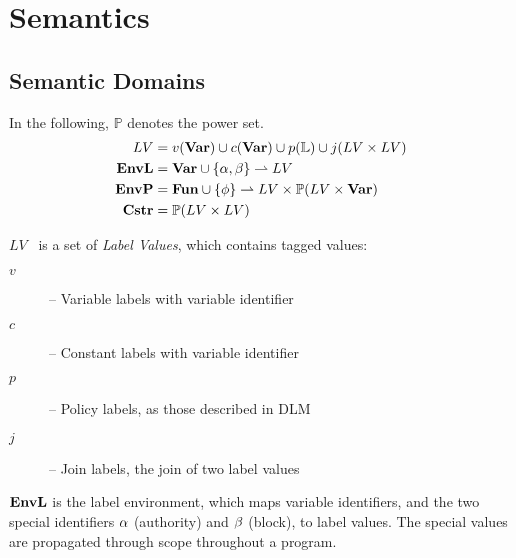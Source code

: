 
\newcommand{\iP}{\mathcal{P}}
\newcommand{\iD}{\mathcal{D}}
\newcommand{\iV}{\mathcal{V}}
\newcommand{\iF}{\mathcal{F}}
\newcommand{\iS}{\mathcal{S}}
\newcommand{\iE}{\mathcal{E}}
\newcommand{\iL}{\mathcal{L}}
\newcommand{\iO}{\mathcal{O}}

\newcommand{\iLV}{LV}

\newcommand{\dblSq}[1]{[\![ #1 ]\!]}

\newcommand{\rspace}{\\[1em]}
\newcommand{\dsWhere}[1]{\quad \text{ where } #1}
\newcommand{\dsAnd}[1]{\quad \text{ and } #1}
\newcommand{\dsIf}[1]{\quad \text{ if } #1}

\section{Semantics}

\subsection{Semantic Domains}
In the following, $\mathbb P$ denotes the power set.
\begin{align*}
\iLV      & = v(\iVar) \cup c(\iVar) \cup p(\mathbb{L}) \cup j(\iLV \times \iLV) \\
\iEnvL  & = \iVar \cup \{ \ia, \ib \} \rightharpoonup \iLV \\
\iEnvP  & = \iFun \cup \{ \ifb \} \rightharpoonup \iLV \times \mathbb P (\iLV \times \iVar) \\
\iCstr  & = \mathbb P (\iLV \times \iLV)
\end{align*}

$\iLV$~ is a set of \emph{Label Values}, which contains tagged values:
\begin{description}
  \item[$v$] -- Variable labels with variable identifier
  \item[$c$] -- Constant labels with variable identifier
  \item[$p$] -- Policy labels, as those described in DLM
  \item[$j$] -- Join labels, the join of two label values
\end{description}

$\mathbf{EnvL}$ is the label environment, which maps variable identifiers, and the two special identifiers $\alpha$ (authority) and $\beta$ (block), to label values.
The special values are propagated through scope throughout a program.


